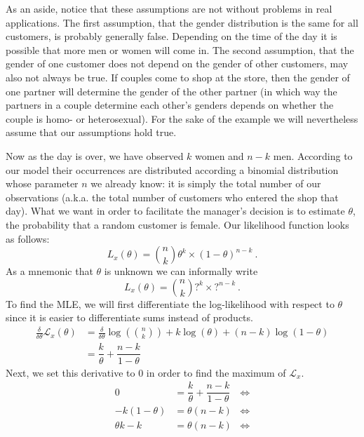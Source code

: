 As an aside, notice that these assumptions are not without problems in real applications. 
The first assumption, that the gender
distribution is the same for all customers, is probably generally false. Depending on the time of the day
it is possible that more men or women will come in. The second assumption, that the gender of one customer
does not depend on the gender of other customers, may also not always be true. If couples come to shop
at the store, then the gender of one partner will determine the gender of the other partner (in which
way the partners in a couple determine each other's genders depends on whether the couple is homo- or
heterosexual). For the sake of the example we will nevertheless assume that our assumptions hold true.

Now as the day is over, we have observed $ k $ women and $ n-k $ men. According to our model their
occurrences are distributed according a binomial distribution whose parameter $ n $ we already know: it
is simply the total number of our observations (a.k.a. the total number of customers who entered the shop 
that day). What we want in order to facilitate the manager's decision is to estimate $ \theta $, the
probability that a random customer is female. Our likelihood function looks as follows:
\begin{equation}
L_{x}(\theta) = \binom{n}{k} \theta^{k} \times (1 - \theta)^{n-k} \ .
\end{equation}
As a mnemonic that $ \theta $ is unknown we can informally write
$$ L_{x}(\theta) = \binom{n}{k} ?^{k} \times ?^{n-k} \ . $$
To find the MLE, we will first differentiate the log-likelihood with respect to $ \theta $ since it is 
easier to differentiate sums instead of products.
\begin{align}
\frac{\delta}{\delta \theta} \mathcal{L}_{x}(\theta)
&= \frac{\delta}{\delta \theta} \log \left(\binom{n}{k}\right) + k\log(\theta) + (n-k)\log(1-\theta) \\
&= \dfrac{k}{\theta} + \dfrac{n-k}{1-\theta}
\end{align}
Next, we set this derivative to 0 in order to find the maximum of $ \mathcal{L}_{x} $.
\begin{align}
0 &= \dfrac{k}{\theta} + \dfrac{n-k}{1-\theta} &\Leftrightarrow \\
-k (1 - \theta) &= \theta (n-k) &\Leftrightarrow \\
\theta k - k &= \theta (n-k) &\Leftrightarrow
\end{align}
